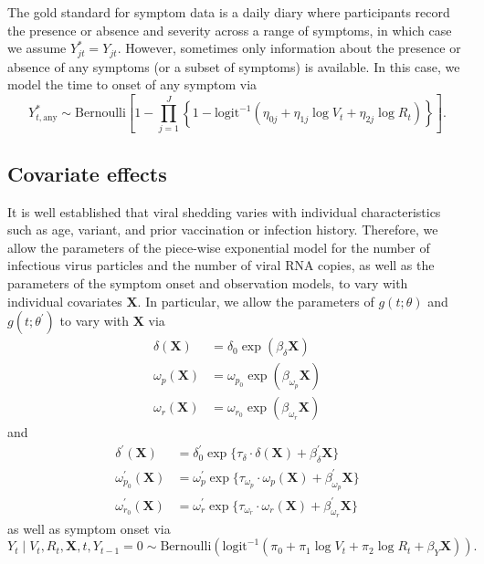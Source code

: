 \documentclass[12pt]{article}
\begin{document}
The gold standard for symptom data is a daily diary where participants record the presence or absence and severity across a range of symptoms, in which case we assume $Y^*_{jt} = Y_{jt}$. However, sometimes only information about the presence or absence of any symptoms (or a subset of symptoms) is available. In this case, we model the time to onset of any symptom via
\begin{equation*}
    Y^*_{t,\text{any}} \sim \text{Bernoulli}\left[1 - \prod_{j=1}^J \left\{1 - \text{logit}^{-1}(\eta_{0j} + \eta_{1j} \log V_t + \eta_{2j} \log R_t)\right\}\right].
\end{equation*}


\subsection{Covariate effects} 
It is well established that viral shedding varies with individual characteristics such as age, variant, and prior vaccination or infection history. Therefore, we allow the parameters of the piece-wise exponential model for the number of infectious virus particles and the number of viral RNA copies, as well as the parameters of the symptom onset and observation models, to vary with individual covariates $\mathbf{X}$. In particular, we allow the parameters of $g(t; \theta)$ and $g(t; \theta^\prime)$ to vary with $\mathbf{X}$ via
\begin{align*}
    \delta(\mathbf{X}) &= \delta_0 \exp(\beta_\delta \mathbf{X}) \\
    \omega_{p}(\mathbf{X}) &= \omega_{p_0} \exp(\beta_{\omega_p} \mathbf{X}) \\
    \omega_{r}(\mathbf{X}) &= \omega_{r_0} \exp(\beta_{\omega_r} \mathbf{X})
\end{align*}
and 
\begin{align*}
    \delta^\prime(\mathbf{X}) &= \delta^\prime_0 \exp\{\tau_{\delta} \cdot \delta(\mathbf{X}) + \beta^\prime_\delta \mathbf{X}\} \\
    \omega^\prime_{p_0}(\mathbf{X}) &= \omega^\prime_{p} \exp\{\tau_{\omega_{p}} \cdot \omega_{p}(\mathbf{X}) + \beta^\prime_{\omega_p} \mathbf{X}\} \\
    \omega^\prime_{r_0}(\mathbf{X}) &= \omega^\prime_{r} \exp\{\tau_{\omega_{r}} \cdot \omega_{r}(\mathbf{X}) + \beta^\prime_{\omega_r} \mathbf{X}\}
\end{align*}
as well as symptom onset via
\begin{equation*}
    Y_t \mid V_t, R_t, \mathbf{X}, t, Y_{t-1} = 0 \sim \text{Bernoulli}(\text{logit}^{-1}(\pi_0 + \pi_1 \log V_t + \pi_2 \log R_t + \beta_{Y} \mathbf{X})).
\end{equation*}
\end{document}
